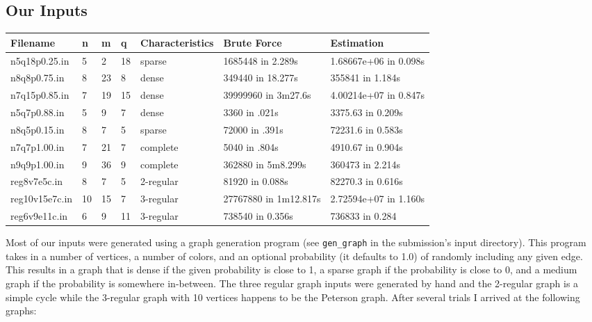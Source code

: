 \documentclass[14]{article}
\begin{document}
\subsection{Our Inputs}
\begin{center}
    \begin{tabular}{ | l | l | l | l | l | l | l | }
    \hline
    \textbf{Filename} & \textbf{n} & \textbf{m} & \textbf{q} & \textbf{Characteristics} & \textbf{Brute Force} & \textbf{Estimation} \\ \hline
    n5q18p0.25.in & 5 & 2 & 18 &sparse & 1685448 in 2.289s &1.68667e+06 in 0.098s   \\ \hline

    n8q8p0.75.in & 8 & 23 & 8 &dense & 349440 in 18.277s &355841 in 1.184s \\ \hline

    n7q15p0.85.in & 7 & 19 & 15 &dense & 39999960 in 3m27.6s & 4.00214e+07 in 0.847s\\ \hline

    n5q7p0.88.in & 5 & 9 & 7 &dense & 3360 in .021s & 3375.63 in 0.209s    \\ \hline

    n8q5p0.15.in & 8 & 7 & 5 &sparse & 72000 in .391s & 72231.6  in 0.583s  \\ \hline

    n7q7p1.00.in & 7 & 21 & 7 &complete & 5040 in .804s &4910.67  in 0.904s\\ \hline

    n9q9p1.00.in & 9 & 36 & 9 &complete & 362880 in 5m8.299s &360473 in 2.214s   \\ \hline

    reg8v7e5c.in & 8 & 7 & 5 & 2-regular & 81920 in 0.088s & 82270.3 in 0.616s \\ \hline

    reg10v15e7c.in & 10 & 15 & 7 & 3-regular & 27767880 in 1m12.817s & 2.72594e+07 in 1.160s \\ \hline

    reg6v9e11c.in & 6 & 9 & 11 & 3-regular & 738540 in 0.356s & 736833 in 0.284\\ \hline
    \end{tabular}
\end{center}
Most of our inputs were generated using a graph generation program (see \texttt{gen\_graph} in the submission's input directory). This program takes in a number of vertices, a number of colors, and an optional probability (it defaults to 1.0) of randomly including any given edge. This results in a graph that is dense if the given probability is close to 1, a sparse graph if the probability is close to 0, and a medium graph if the probability is somewhere in-between. The three regular graph inputs were generated by hand and the 2-regular graph is a simple cycle while the 3-regular graph with 10 vertices happens to be the Peterson graph. After several trials I arrived at the following graphs:
\end{document}
